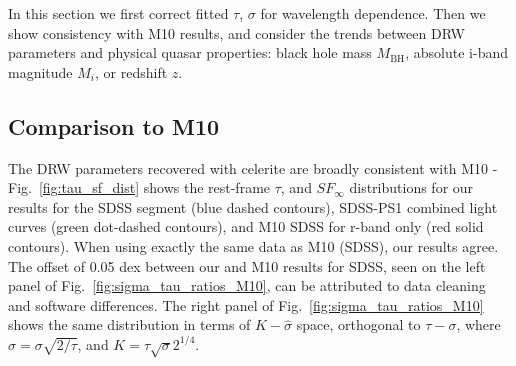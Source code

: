 \documentclass[twocolumn]{aastex62}
\newcommand{\project}[1]{\textsf{#1}}
\begin{document}
In this section we first correct fitted $\tau$, $\sigma$ for wavelength dependence. Then we show consistency with M10 results,  and consider the trends between DRW parameters and physical quasar properties: black hole mass $M_{\mathrm{BH}}$, absolute i-band  magnitude $M_{i}$, or redshift $z$.  


\subsection{Comparison to M10}
The DRW parameters recovered with \project{celerite} are  broadly consistent with M10 - Fig.~\ref{fig:tau_sf_dist} shows the rest-frame  $\tau$, and $SF_{\infty}$ distributions for our results for the SDSS segment (blue dashed contours),  SDSS-PS1 combined light curves (green dot-dashed contours), and  M10 SDSS for r-band only (red solid contours). When using exactly the same data as M10 (SDSS), our results agree. The offset of 0.05 dex  between our and M10 results for SDSS, seen on the left panel of Fig.~\ref{fig:sigma_tau_ratios_M10}, can be attributed to data cleaning and software differences. The right panel of Fig.~\ref{fig:sigma_tau_ratios_M10} shows the same distribution in terms of $K-\hat{\sigma}$ space, orthogonal to $\tau-\sigma$, where $\hat{\sigma} = \sigma\sqrt{2 / \tau}$, and $K = \tau \sqrt{\sigma} 2^{1/4} $. 


\begin{figure*} %
\caption{Comparison of \project{celerite} fits using only the  SDSS r-band segments of S82 quasars ($\sigma_{\mathrm{SDSS}}, \tau_{\mathrm{SDSS}}$), against M10 results for SDSS r-band ($\sigma_{M10}, \tau_{M10}$), object-by-object. The small offset ($<0.05 $ dex) can be attributed to software differences. See Fig.~\ref{fig:tau_sf_dist} for a comparison of rest-frame $\tau$ and $SF_{\infty}$ distributions. This is similar to Fig.3 in M10, except we plot only the r-band SDSS results. The right-hand panel shows the comparison in an orthogonal $K-\hat{\sigma}$  space. } 
\label{fig:sigma_tau_ratios_M10}
\end{figure*} 
\end{document}
